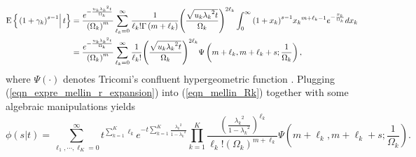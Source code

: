 \documentclass[12pt,onecolumn,draftcls]{IEEEtran}
\begin{document}
\begin{align}\label{eqn_expre_mellin_r_expansion}
{\rm{E}}\left\{ {\left. {{{\left( {1 + \gamma_k} \right)}^{s - 1}}} \right|t} \right\} %
 &= \frac{{{e^{ - \frac{{{u_k}{\lambda _k}^2t}}{{{\Omega _k}}}}}}}{{{{\left( {{\Omega _k}} \right)}^m}}}\sum\limits_{{\ell_k} = 0}^\infty  {\frac{1}{{{\ell_k}!\Gamma \left( {m + {\ell_k}} \right)}}{{{{\left( {\frac{{\sqrt {{u_k}{\lambda _k}^2t} }}{{{\Omega _k}}}} \right)}^{2{\ell_k}}}}}} \int\nolimits_0^\infty  {{{\left( {1 + {x_k}} \right)}^{s - 1}}{x_k}^{m + {\ell_k} - 1}{e^{ - \frac{{{x_k}}}{{{\Omega _k}}}}}d{x_k}} \notag \\
 &= \frac{{{e^{ - \frac{{{u_k}{\lambda _k}^2t}}{{{\Omega _k}}}}}}}{{{{\left( {{\Omega _k}} \right)}^m}}}\sum\limits_{{\ell_k} = 0}^\infty  {\frac{1}{{{\ell_k}!}}{{{{\left( {\frac{{\sqrt {{u_k}{\lambda _k}^2t} }}{{{\Omega _k}}}} \right)}^{2{\ell_k}}}}}} \Psi \left( {m + {\ell_k}, m + {\ell_k} + s;\frac{1}{{{\Omega _k}}}} \right),
\end{align}
where $\Psi \left( \cdot \right)$ denotes Tricomi's confluent hypergeometric function \cite[Eq.9.211.4]{gradshteyn1965table}. Plugging (\ref{eqn_expre_mellin_r_expansion}) into (\ref{eqn_mellin_Rk}) together with some algebraic manipulations yields
\begin{equation}\label{eqn_mellin_Rk1}
\phi \left( {\left. s \right|t} \right)
= \sum\limits_{{\ell_1}, \cdots ,{\ell_K} = 0}^\infty  {{t^{\sum\limits_{k = 1}^K {{\ell_k}} }}{e^{ - t\sum\limits_{k = 1}^K {\frac{{{\lambda _k}^2}}{{1 - {\lambda _k}^2}}} }}\prod\limits_{k = 1}^K {\frac{{{{\left( {\frac{{{\lambda _k}^2}}{{1 - {\lambda _k}^2}}} \right)}^{{\ell_k}}}}}{{{\ell_k}!{{\left( {{\Omega _k}} \right)}^{m + {\ell_k}}}}}\Psi \left( {m + {\ell_k},m + {\ell_k} + s;\frac{1}{{{\Omega _k}}}} \right)} }.
\end{equation}
\end{document}
